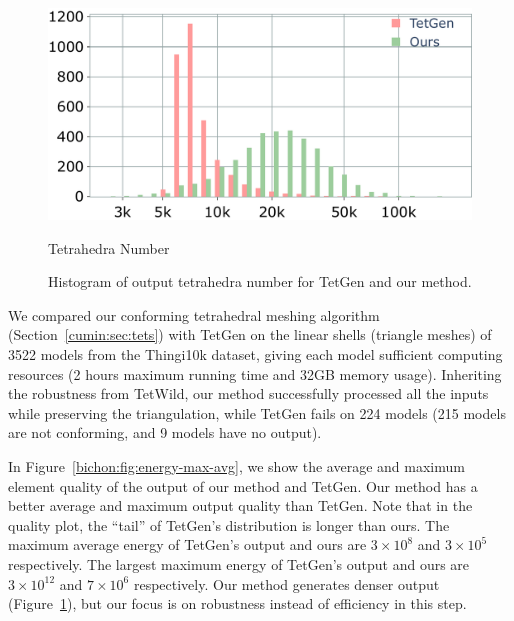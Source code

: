 \begin{figure}
    \centering
    \parbox{.7\linewidth}{\centering
    \parbox{0.02\linewidth}{\centering{}}\hfill
    \parbox{.95\linewidth}{\includegraphics[width=\linewidth]{curve_meshing_in_shell_tex/figs/stats/tetgen_TO}}\par
    \scriptsize{Tetrahedra Number}
    }
    \caption{Histogram of output tetrahedra number for TetGen and {our} method. }
    \label{bichon:fig:numt}
\end{figure}

We compared our conforming tetrahedral meshing algorithm (Section~\ref{cumin:sec:tets}) with TetGen on the linear shells (triangle meshes) of 3522 models from the Thingi10k dataset, giving each model sufficient computing resources (2 hours maximum running time and 32GB memory usage). Inheriting the robustness from TetWild, our method successfully processed all the inputs while preserving the triangulation, while TetGen fails on 224 models (215 models are not conforming, and 9 models have no output).


In Figure~\ref{bichon:fig:energy-max-avg}, we show the average and maximum element quality of the output of our method and TetGen. Our method has {a} better average and maximum output quality than TetGen. Note that in the quality plot, the ``tail'' of TetGen's distribution is longer than ours. The maximum average energy of TetGen's output and ours are $3\times 10^8$ and $3 \times 10^5$ respectively. The largest maximum energy of TetGen's output and ours are $3\times 10^{12}$ and $7 \times 10^6$ respectively. Our method generates denser output (Figure~\ref{bichon:fig:numt}), but our focus is on robustness instead of efficiency in this step.


